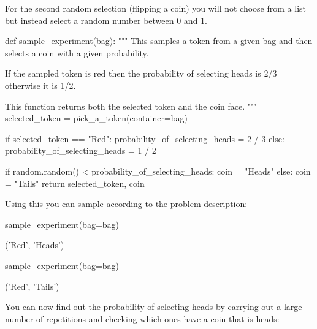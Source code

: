 \begin{note}
For the second random selection (flipping a coin) you will not choose from a list
but instead select a random number between 0 and 1.
\end{note}





\begin{pyin}
def sample_experiment(bag):
    """
    This samples a token from a given bag and then
    selects a coin with a given probability.

    If the sampled token is red then the probability
    of selecting heads is 2/3 otherwise it is 1/2.

    This function returns both the selected token
    and the coin face.
    """
    selected_token = pick_a_token(container=bag)

    if selected_token == "Red":
        probability_of_selecting_heads = 2 / 3
    else:
        probability_of_selecting_heads = 1 / 2

    if random.random() < probability_of_selecting_heads:
        coin = "Heads"
    else:
        coin = "Tails"
    return selected_token, coin
\end{pyin}





Using this you can sample according to the problem description:





\begin{pyin}
sample_experiment(bag=bag)
\end{pyin}





\begin{raw}
('Red', 'Heads')
\end{raw}


\begin{pyin}
sample_experiment(bag=bag)
\end{pyin}

\begin{raw}
('Red', 'Tails')
\end{raw}






You can now find out the probability of selecting heads by carrying out a large
number of repetitions and checking which ones have a coin that is heads:





